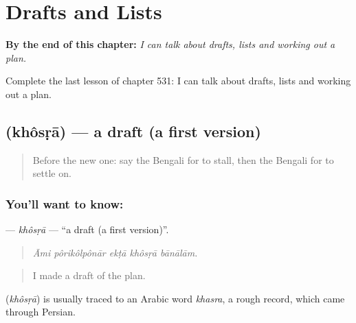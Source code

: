 
\chapter{Drafts and Lists}
\label{ch:bn-drafts-and-lists}

\begin{chapteropening}
\textbf{By the end of this chapter:} \emph{I can talk about drafts, lists and working out a plan.}

Complete the last lesson of chapter 531: I can talk about drafts, lists and working out a plan.
\end{chapteropening}

\section[\texorpdfstring{\bn{খসড়া} (khôsṛā)}{খসড়া (khôsṛā)}]{ (khôsṛā) — a draft (a first version)}

\label{lesson:BN-C531-khosra}



\begin{quote}
Before the new one: say the Bengali for to stall, then the Bengali for to settle on.
\end{quote}

\subsection*{You'll want to know: }
\textbf{} — \emph{khôsṛā} — \textquotedblleft{}a draft (a first version)\textquotedblright{}.

\begin{quote}
    
\end{quote}

\begin{quote}
\emph{Āmi pôrikôlpônār ekṭā khôsṛā bānālām.}
\end{quote}

\begin{quote}
I made a draft of the plan.
\end{quote}

\begin{cousinweb}
\textbf{} (\emph{khôsṛā}) is usually traced to an Arabic word \emph{khasra}, a rough record, which came through Persian.
\end{cousinweb}

